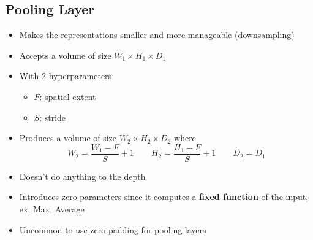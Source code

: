 \subsection{Pooling Layer}
\begin{itemize}
	\item Makes the representations smaller and more manageable (downsampling)
	\item Accepts a volume of size $W_1 \times H_1\times D_1$
	\item With 2 hyperparameters
	\begin{itemize}
		\item $F$: spatial extent
		\item $S$: stride
	\end{itemize}	
	\item Produces a volume of size $W_2\times H_2\times D_2$ where
	$$W_2 = \frac{W_1-F}{S} + 1\qquad H_2 = \frac{H_1-F}{S} + 1\qquad D_2=D_1$$
	\item Doesn't do anything to the depth
	\item Introduces zero parameters since it computes a \textbf{fixed function} of the input, ex. Max, Average
	\item Uncommon to use zero-padding for pooling layers
\end{itemize}
